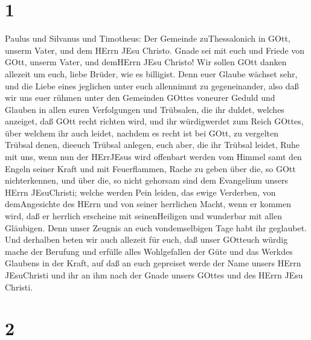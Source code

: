\hypertarget{section}{%
\section{1}\label{section}}

 Paulus und Silvanus und Timotheus: Der Gemeinde
zuThessalonich in GOtt, unserm Vater, und dem HErrn JEsu Christo.
 Gnade sei mit euch und Friede von GOtt, unserm Vater, und
demHErrn JEsu Christo!  Wir sollen GOtt danken allezeit um
euch, liebe Brüder, wie es billigist. Denn euer Glaube wächset sehr, und
die Liebe eines jeglichen unter euch allennimmt zu gegeneinander,
 also daß wir uns euer rühmen unter den Gemeinden GOttes
voneurer Geduld und Glauben in allen euren Verfolgungen und Trübsalen,
die ihr duldet,  welches anzeiget, daß GOtt recht richten
wird, und ihr würdigwerdet zum Reich GOttes, über welchem ihr auch
leidet,  nachdem es recht ist bei GOtt, zu vergelten Trübsal
denen, dieeuch Trübsal anlegen,  euch aber, die ihr Trübsal
leidet, Ruhe mit uns, wenn nun der HErrJEsus wird offenbart werden vom
Himmel samt den Engeln seiner Kraft  und mit Feuerflammen,
Rache zu geben über die, so GOtt nichterkennen, und über die, so nicht
gehorsam sind dem Evangelium unsers HErrn JEsuChristi; 
welche werden Pein leiden, das ewige Verderben, von demAngesichte des
HErrn und von seiner herrlichen Macht,  wenn er kommen
wird, daß er herrlich erscheine mit seinenHeiligen und wunderbar mit
allen Gläubigen. Denn unser Zeugnis an euch vondemselbigen Tage habt ihr
geglaubet.  Und derhalben beten wir auch allezeit für euch,
daß unser GOtteuch würdig mache der Berufung und erfülle alles
Wohlgefallen der Güte und das Werkdes Glaubens in der Kraft,
 auf daß an euch gepreiset werde der Name unsers HErrn
JEsuChristi und ihr an ihm nach der Gnade unsers GOttes und des HErrn
JEsu Christi.

\hypertarget{section-1}{%
\section{2}\label{section-1}}

